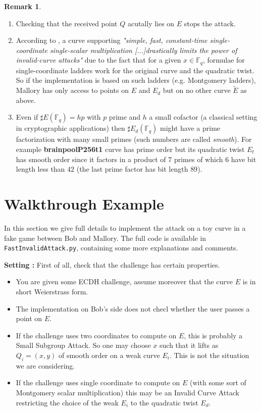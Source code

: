 \documentclass[10pt]{article}
\theoremstyle{definition}
\newtheorem{remark}{Remark}
\newcommand{\F}{\mathbb{F}}
\begin{document}
\begin{remark}
\begin{enumerate}
\item Checking that the received point $Q$ acutally lies on $E$ stops the attack.
\item According to \cite{cryptoeprint:2024/1265}, a curve supporting \textsl{"simple, fast, constant-time single-coordinate single-scalar multiplication [...]drastically limits the power of invalid-curve attacks"} due to the fact that for a given $x \in \F_q$, formulae for single-coordinate ladders work for the original curve and the quadratic twist.
So if the implementation is based on such ladders (e.g. Montgomery ladders), Mallory has only access to points on $E$ and $E_d$ but on no other curve $\tilde{E}$ as above.
\item Even if $\sharp{} E(\F_q) = hp$ with $p$ prime and $h$ a small cofactor (a classical setting in cryptographic applications) then $\sharp{}E_d(\F_q)$ might have a prime factorization with many small primes (such numbers are called \textsl{smooth}).
For example \textbf{brainpoolP256t1} curve has prime order but its quadratic twist $E_t$ has smooth order since it factors in a product of $7$ primes of which $6$ have bit length less than $42$ (the last prime factor has bit length $89$).
\end{enumerate}
\end{remark}

\section{Walkthrough Example}

In this section we give full details to implement the attack on a toy curve in a fake game between Bob and Mallory.
The full code is available in \verb|FastInvalidAttack.py|, containing some more explanations and comments.

\vspace*{.5cm}
\textbf{Setting :} First of all, check that the challenge has certain properties.
\begin{itemize}
\item You are given some ECDH challenge, assume moreover that the curve $E$ is in short Weierstrass form.
\item The implementation on Bob's side does not checl whether the user passes a point on $E$.
\item If the challenge uses two coordinates to compute on $E$, this is probably a Small Subgroup Attack.
So one may choose $x$ such that it lifts as $Q_i=(x,y)$ of smooth order on a weak curve $E_i$.
This is not the situation we are considering.
\item If the challenge uses single coordinate to compute on $E$ (with some sort of Montgomery scalar multiplication) this may be an Invalid Curve Attack restricting the choice of the weak $E_i$ to the quadratic twist $E_d$.
\end{itemize}
\end{document}
